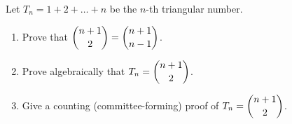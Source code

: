 Let $T_n=1+2+\dots+n$ be the $n$-th triangular number.
\begin{enumerate}
\item[(a)] Prove that $\dbinom{n+1}{2}=\dbinom{n+1}{n-1}$.
\item[(b)] Prove algebraically that $T_n=\dbinom{n+1}{2}$.
\item[(c)] Give a counting (committee-forming) proof of $T_n=\dbinom{n+1}{2}$.
\end{enumerate}
